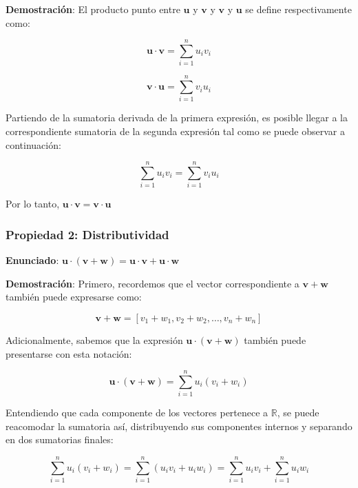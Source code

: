 \documentclass[12 pt]{article}
\begin{document}
\textbf{Demostración}: El producto punto entre \(\mathbf{u}\) y \(\mathbf{v}\) y \(\mathbf{v}\) y \(\mathbf{u}\) se define respectivamente como:

\[
\mathbf{u} \cdot \mathbf{v} = \sum_{i=1}^{n} u_i v_i
\]

\[
\mathbf{v} \cdot \mathbf{u} = \sum_{i=1}^{n} v_i u_i
\]

Partiendo de la sumatoria derivada de la primera expresión, es posible llegar a la correspondiente sumatoria de la segunda expresión tal como se puede observar a continuación:

\[
\sum_{i=1}^{n} u_i v_i = \sum_{i=1}^{n} v_i u_i
\]

\begin{center}
Por lo tanto, \(\mathbf{u} \cdot \mathbf{v} = \mathbf{v} \cdot \mathbf{u}\)\\
\end{center}


\subsubsection*{Propiedad 2: Distributividad}

\begin{center}
\textbf{Enunciado}: \(\mathbf{u} \cdot (\mathbf{v} + \mathbf{w}) = \mathbf{u} \cdot \mathbf{v} + \mathbf{u} \cdot \mathbf{w}\)\\
\end{center}

\textbf{Demostración}: Primero, recordemos que el vector correspondiente a \(\mathbf{v} + \mathbf{w}\) también puede expresarse como:

\[
\mathbf{v} + \mathbf{w} = [v_1 + w_1, v_2 + w_2, \dots, v_n + w_n]
\]

Adicionalmente, sabemos que la expresión \(\mathbf{u} \cdot (\mathbf{v} + \mathbf{w})\) también puede presentarse con esta notación:

\[
\mathbf{u} \cdot (\mathbf{v} + \mathbf{w}) = \sum_{i=1}^{n} u_i (v_i + w_i)
\]

Entendiendo que cada componente de los vectores pertenece a \(\mathbb{R}\), se puede reacomodar la sumatoria así, distribuyendo sus componentes internos y separando en dos sumatorias finales:

\[
\sum_{i=1}^{n} u_i (v_i + w_i) = \sum_{i=1}^{n} (u_i v_i + u_i w_i) = \sum_{i=1}^{n} u_i v_i + \sum_{i=1}^{n} u_i w_i
\]
\end{document}
